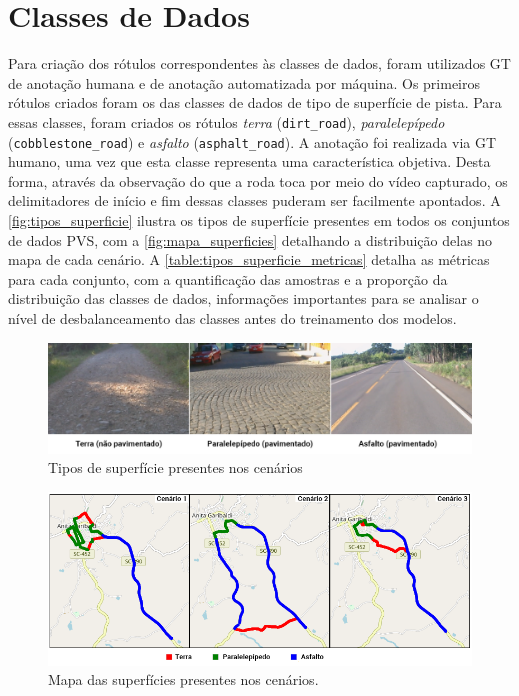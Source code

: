 \newpage
\section{Classes de Dados}

Para criação dos rótulos correspondentes às classes de dados, foram utilizados GT de anotação humana e de anotação automatizada por máquina. Os primeiros rótulos criados foram os das classes de dados de tipo de superfície de pista. Para essas classes, foram criados os rótulos \emph{terra} (\texttt{dirt\_road}), \emph{paralelepípedo} (\texttt{cobblestone\_road}) e \emph{asfalto} (\texttt{asphalt\_road}). A anotação foi realizada via GT humano, uma vez que esta classe representa uma característica objetiva. Desta forma, através da observação do que a roda toca por meio do vídeo capturado, os delimitadores de início e fim dessas classes puderam ser facilmente apontados. A \autoref{fig:tipos_superficie} ilustra os tipos de superfície presentes em todos os conjuntos de dados PVS, com a \autoref{fig:mapa_superficies} detalhando a distribuição delas no mapa de cada cenário. A \autoref{table:tipos_superficie_metricas} detalha as métricas para cada conjunto, com a quantificação das amostras e a proporção da distribuição das classes de dados, informações importantes para se analisar o nível de desbalanceamento das classes antes do treinamento dos modelos. 

\begin{figure}[H]
  \centering
  \caption{Tipos de superfície presentes nos cenários}
   \label{fig:tipos_superficie}
   \includegraphics[width=1\textwidth]{figuras/fig_23.png}
\end{figure}

\begin{figure}[H]
  \centering
  \caption{Mapa das superfícies presentes nos cenários.}
   \label{fig:mapa_superficies}
   \includegraphics[width=1\textwidth]{figuras/fig_25.png}
\end{figure}

